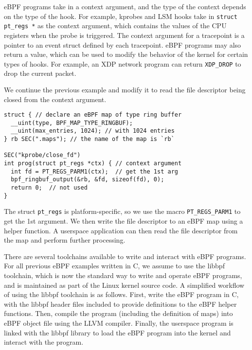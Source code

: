 eBPF programs take in a context argument, and the type of the context depends on the type of the hook.
For example, kprobes and LSM hooks take in \texttt{struct pt\_regs *} as the context argument,
which contains the values of the CPU registers when the probe is triggered.
The context argument for a tracepoint is a pointer to an event struct defined by each tracepoint.
eBPF programs may also return a value, which can be used to modify the behavior of the kernel for certain types of hooks.
For example, an XDP network program can return \texttt{XDP\_DROP} to drop the current packet.

We continue the previous example and modify it to read the file descriptor being closed from the context argument.

\begin{verbatim}
struct { // declare an eBPF map of type ring buffer
  __uint(type, BPF_MAP_TYPE_RINGBUF);
  __uint(max_entries, 1024); // with 1024 entries
} rb SEC(".maps"); // the name of the map is `rb`

SEC("kprobe/close_fd")
int prog(struct pt_regs *ctx) { // context argument
  int fd = PT_REGS_PARM1(ctx);  // get the 1st arg
  bpf_ringbuf_output(&rb, &fd, sizeof(fd), 0);
  return 0;  // not used
}
\end{verbatim}

The struct \texttt{pt\_regs} is platform-specific, so we use the macro \texttt{PT\_REGS\_PARM1} to get the 1st argument.
We then write the file descriptor to an eBPF map using a helper function.
A userspace application can then read the file descriptor from the map and perform further processing.





There are several toolchains available to write and interact with eBPF programs.
For all previous eBPF examples written in C, we assume to use the libbpf toolchain,
which is now the standard way to write and operate eBPF programs,
and is maintained as part of the Linux kernel source code.
A simplified workflow of using the libbpf toolchain is as follows.
First, write the eBPF program in C, with the libbpf header files included to provide definitions to the eBPF helper functions.
Then, compile the program (including the definition of maps) into eBPF object file using the LLVM compiler.
Finally, the userspace program is linked with the libbpf library to load the eBPF program into the kernel and interact with the program.

